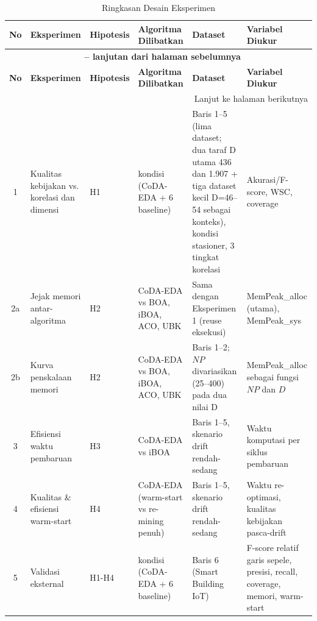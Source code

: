 \begin{longtable}{|c|>{\raggedright\arraybackslash}p{2.2cm}|p{1.6cm}|>{\raggedright\arraybackslash}p{2.8cm}|>{\raggedright\arraybackslash}p{3cm}|>{\raggedright\arraybackslash}p{2.8cm}|}
\caption{Ringkasan Desain Eksperimen}
\label{tab:desain-eksperimen} \\
\hline
\textbf{No} & \textbf{Eksperimen} & \textbf{Hipotesis} & \textbf{Algoritma Dilibatkan} & \textbf{Dataset} & \textbf{Variabel Diukur} \\
\hline
\endfirsthead

\multicolumn{6}{c}{{\bfseries \tablename\ \thetable{} -- lanjutan dari halaman sebelumnya}} \\
\hline
\textbf{No} & \textbf{Eksperimen} & \textbf{Hipotesis} & \textbf{Algoritma Dilibatkan} & \textbf{Dataset} & \textbf{Variabel Diukur} \\
\hline
\endhead

\hline
\multicolumn{6}{r}{Lanjut ke halaman berikutnya} \\
\endfoot

\hline
\endlastfoot

1 & Kualitas kebijakan vs. korelasi dan dimensi & H1 & 7 kondisi (CoDA-EDA + 6 baseline) & Baris 1--5 (lima dataset; dua taraf D utama 436 dan 1.907 + tiga dataset kecil D=46--54 sebagai konteks), kondisi stasioner, 3 tingkat korelasi & Akurasi/F-score, WSC, coverage \\
\hline
2a & Jejak memori antar-algoritma & H2 & CoDA-EDA vs BOA, iBOA, ACO, UBK & Sama dengan Eksperimen 1 (reuse eksekusi) & MemPeak\_alloc (utama), MemPeak\_sys\label{first:mempeaksys} \\
\hline
2b & Kurva penskalaan memori & H2 & CoDA-EDA vs BOA, iBOA, ACO, UBK & Baris 1--2; $NP$ divariasikan (25--400) pada dua nilai D & MemPeak\_alloc sebagai fungsi $NP$ dan $D$ \\
\hline
3 & Efisiensi waktu pembaruan & H3 & CoDA-EDA vs iBOA & Baris 1--5, skenario drift rendah-sedang & Waktu komputasi per siklus pembaruan \\
\hline
4 & Kualitas \& efisiensi warm-start & H4 & CoDA-EDA (warm-start vs re-mining penuh) & Baris 1--5, skenario drift rendah-sedang & Waktu re-optimasi, kualitas kebijakan pasca-drift \\
\hline
5 & Validasi eksternal & H1-H4 & 7 kondisi (CoDA-EDA + 6 baseline) & Baris 6 (Smart Building IoT) & F-score relatif garis sepele, presisi, recall, coverage, memori, warm-start \\
\hline

\end{longtable}

